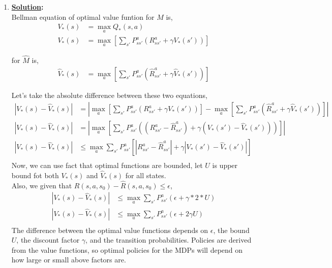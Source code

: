 \documentclass[12pt]{article}
\newcommand{\solution}{\noindent \textbf{\underline{Solution}: }}
\begin{document}
\begin{enumerate}
    \item \solution \\
    Bellman equation of optimal value funtion for $M$ is,
    \begin{align*}
        V_*(s) &= \max_a Q_*(s,a) \\
        V_*(s) &= \max_a \left[ \sum_{s'} P_{ss'}^a \left(R^a_{ss'} + \gamma V_*(s')\right) \right]
    \end{align*}
    
    for $\hat{M}$ is,
    \begin{align*}
        \hat{V}_*(s) &= \max_a \left[ \sum_{s'} P_{ss'}^a \left(\hat{R}^a_{ss'} + \gamma \hat{V}_*(s')\right) \right]
    \end{align*}

    Let's take the absolute difference between these two equations,
    \begin{align*}
        \left\lvert V_*(s) - \hat{V}_*(s) \right\rvert  &= \left\lvert \max_a \left[ \sum_{s'} P_{ss'}^a \left(R^a_{ss'} + \gamma V_*(s')\right) \right] - \max_a \left[ \sum_{s'} P_{ss'}^a \left(\hat{R}^a_{ss'} + \gamma \hat{V}_*(s')\right) \right] \right\rvert \\
        \left\lvert V_*(s) - \hat{V}_*(s) \right\rvert  &= \left\lvert \max_a \left[ \sum_{s'} P_{ss'}^a \left(\left(R^a_{ss'} - \hat{R}^a_{ss'}\right) + \gamma \left(V_*(s') - \hat{V}_*(s')\right)\right) \right] \right\rvert \\ 
        \left\lvert V_*(s) - \hat{V}_*(s) \right\rvert  &\leq \max_a \sum_{s'} P_{ss'}^a \left[ \left\lvert R^a_{ss'} - \hat{R}^a_{ss'} \right\rvert + \gamma \left\lvert V_*(s') - \hat{V}_*(s') \right\rvert \right]  \\
    \end{align*}
    Now, we can use fact that optimal functions are bounded, let $U$ is upper bound fot both $V_*(s)$ and $\hat{V}_*(s)$ for all states. \\
    Also, we given that $R(s, a, s_0) - \hat{R}(s, a, s_0) \leq \epsilon$,
    \begin{align*}
        \left\lvert V_*(s) - \hat{V}_*(s) \right\rvert  &\leq \max_a \sum_{s'} P_{ss'}^a \left( \epsilon + \gamma * 2*U \right)  \\
        \left\lvert V_*(s) - \hat{V}_*(s) \right\rvert  &\leq \max_a \sum_{s'} P_{ss'}^a \left( \epsilon + 2\gamma U \right)  \\
    \end{align*}
    The difference between the optimal value functions depends on $\epsilon$, the bound $U$, the discount factor $\gamma$, and the transition probabilities.
    Policies are derived from the value functions, so optimal policies for the MDPs will depend on how large or small above factors are.


\end{enumerate}
\end{document}
